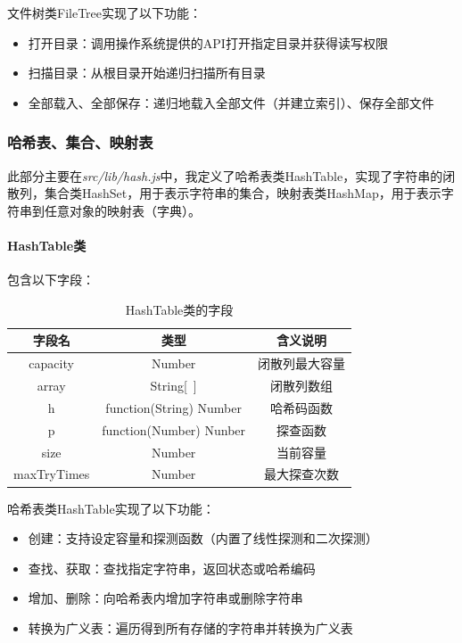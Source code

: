 \documentclass[scheme = chinese]{ctexart}
\begin{document}
文件树类FileTree实现了以下功能：
\begin{itemize}
    \item 打开目录：调用操作系统提供的API打开指定目录并获得读写权限
    \item 扫描目录：从根目录开始递归扫描所有目录
    \item 全部载入、全部保存：递归地载入全部文件（并建立索引）、保存全部文件
\end{itemize}

\subsubsection{哈希表、集合、映射表}
此部分主要在\emph{src/lib/hash.js}中，我定义了哈希表类HashTable，实现了字符串的闭散列，集合类HashSet，用于表示字符串的集合，映射表类HashMap，用于表示字符串到任意对象的映射表（字典）。

\paragraph{HashTable类} 包含以下字段：
\begin{table}[H]
    \centering
    \caption{HashTable类的字段}
    \begin{tabular}{ccc}
        \toprule
        字段名 & 类型 & 含义说明 \\
        \midrule
        capacity & Number & 闭散列最大容量 \\
        array & String[~] & 闭散列数组 \\
        h & function(String) Number & 哈希码函数 \\
        p & function(Number) Nunber & 探查函数 \\
        size & Number & 当前容量 \\
        maxTryTimes & Number & 最大探查次数 \\
        \bottomrule
    \end{tabular}
\end{table}

哈希表类HashTable实现了以下功能：
\begin{itemize}
    \item 创建：支持设定容量和探测函数（内置了线性探测和二次探测）
    \item 查找、获取：查找指定字符串，返回状态或哈希编码
    \item 增加、删除：向哈希表内增加字符串或删除字符串
    \item 转换为广义表：遍历得到所有存储的字符串并转换为广义表
\end{itemize}
\end{document}
